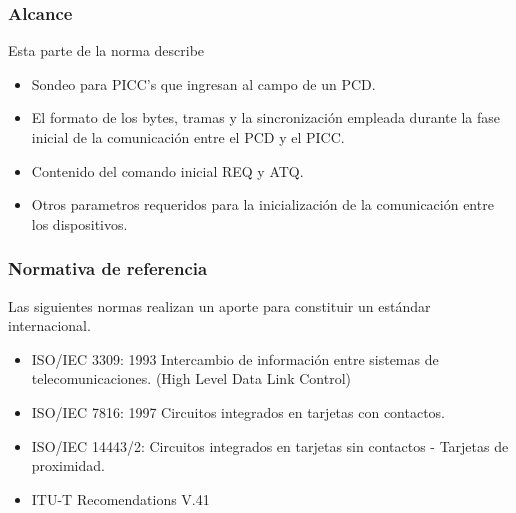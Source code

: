 \subsubsection{Alcance}
Esta parte de la norma describe\par

\begin{itemize}
	\item Sondeo para PICC’s que ingresan al campo de un PCD.\par

	\item El formato de los bytes, tramas y la sincronización empleada durante la fase inicial de la comunicación entre el PCD y el PICC.\par

	\item Contenido del comando inicial REQ y ATQ.\par

	\item Otros parametros requeridos para la inicialización de la comunicación entre los dispositivos.
\end{itemize}\par

\subsubsection{Normativa de referencia}
Las siguientes normas realizan un aporte para constituir un estándar internacional.\par

\begin{itemize}
	\item ISO/IEC 3309: 1993 Intercambio de información entre sistemas de telecomunicaciones. (High Level Data Link Control)\par

	\item ISO/IEC 7816: 1997 Circuitos integrados en tarjetas con contactos.\par

	\item ISO/IEC 14443/2: Circuitos integrados en tarjetas sin contactos - Tarjetas de proximidad.\par

	\item ITU-T Recomendations V.41
\end{itemize}\par

